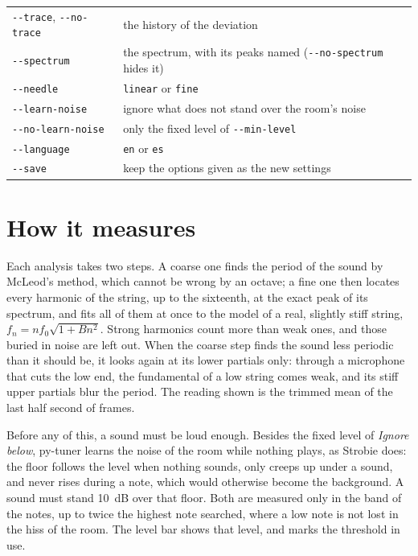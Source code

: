 \documentclass[12pt,
              article,
              oneside
              ]{memoir}
\newcommand*{\menu}[1]{\textit{#1}}
\begin{document}
\begin{longtable}{@{}lp{}@{}}
\texttt{-{}-trace}, \texttt{-{}-no-trace} & the history of the deviation\\
\texttt{-{}-spectrum} & the spectrum, with its peaks named (\texttt{-{}-no-spectrum} hides it)\\
\texttt{-{}-needle} & \texttt{linear} or \texttt{fine}\\
\texttt{-{}-learn-noise} & ignore what does not stand over the room's noise\\
\texttt{-{}-no-learn-noise} & only the fixed level of \texttt{-{}-min-level}\\
\texttt{-{}-language} & \texttt{en} or \texttt{es}\\
\texttt{-{}-save} & keep the options given as the new settings\\
\bottomrule
\end{longtable}

\section{How it measures}
\label{sec:how}

%
Each analysis takes two steps. A coarse one finds the period of the sound
by McLeod's method, which cannot be wrong by an octave; a fine one then
locates every harmonic of the string, up to the sixteenth, at the exact
peak of its spectrum, and fits all of them at once to the model of a real,
slightly stiff string, $f_n = n f_0 \sqrt{1 + B n^2}$. Strong harmonics
count more than weak ones, and those buried in noise are left out. When
the coarse step finds the sound less periodic than it should be, it looks
again at its lower partials only: through a microphone that cuts the low
end, the fundamental of a low string comes weak, and its stiff upper
partials blur the period. The reading shown is the trimmed mean of the
last half second of frames.

%
Before any of this, a sound must be loud enough. Besides the fixed level of
\menu{Ignore below}, py-tuner learns the noise of the room while nothing
plays, as Strobie does: the floor follows the level when nothing sounds,
only creeps up under a sound, and never rises during a note, which would
otherwise become the background. A sound must stand 10~dB over that floor.
Both are measured only in the band of the notes, up to twice the highest
note searched, where a low note is not lost in the hiss of the room. The
level bar shows that level, and marks the threshold in use.
\end{document}
